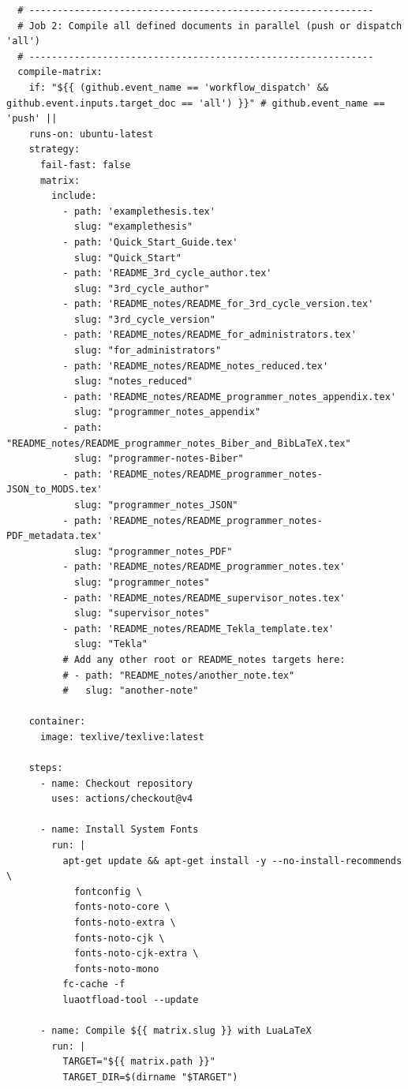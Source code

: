 \documentclass[12pt, twoside]{article}
\begin{document}
\begin{lstlisting}
  # -------------------------------------------------------------
  # Job 2: Compile all defined documents in parallel (push or dispatch 'all')
  # -------------------------------------------------------------
  compile-matrix:
    if: "${{ (github.event_name == 'workflow_dispatch' && github.event.inputs.target_doc == 'all') }}" # github.event_name == 'push' ||
    runs-on: ubuntu-latest
    strategy:
      fail-fast: false
      matrix:
        include:
          - path: 'examplethesis.tex'
            slug: "examplethesis"
          - path: 'Quick_Start_Guide.tex'
            slug: "Quick_Start"
          - path: 'README_3rd_cycle_author.tex'
            slug: "3rd_cycle_author"
          - path: 'README_notes/README_for_3rd_cycle_version.tex'
            slug: "3rd_cycle_version"
          - path: 'README_notes/README_for_administrators.tex'
            slug: "for_administrators"
          - path: 'README_notes/README_notes_reduced.tex'
            slug: "notes_reduced"
          - path: 'README_notes/README_programmer_notes_appendix.tex'
            slug: "programmer_notes_appendix"
          - path: "README_notes/README_programmer_notes_Biber_and_BibLaTeX.tex"
            slug: "programmer-notes-Biber"
          - path: 'README_notes/README_programmer_notes-JSON_to_MODS.tex'
            slug: "programmer_notes_JSON"
          - path: 'README_notes/README_programmer_notes-PDF_metadata.tex'
            slug: "programmer_notes_PDF"
          - path: 'README_notes/README_programmer_notes.tex'
            slug: "programmer_notes"
          - path: 'README_notes/README_supervisor_notes.tex'
            slug: "supervisor_notes"
          - path: 'README_notes/README_Tekla_template.tex'
            slug: "Tekla"
          # Add any other root or README_notes targets here:
          # - path: "README_notes/another_note.tex"
          #   slug: "another-note"

    container:
      image: texlive/texlive:latest

    steps:
      - name: Checkout repository
        uses: actions/checkout@v4

      - name: Install System Fonts
        run: |
          apt-get update && apt-get install -y --no-install-recommends \
            fontconfig \
            fonts-noto-core \
            fonts-noto-extra \
            fonts-noto-cjk \
            fonts-noto-cjk-extra \
            fonts-noto-mono 
          fc-cache -f
          luaotfload-tool --update

      - name: Compile ${{ matrix.slug }} with LuaLaTeX
        run: |
          TARGET="${{ matrix.path }}"
          TARGET_DIR=$(dirname "$TARGET")
          

\end{lstlisting}
\end{document}
